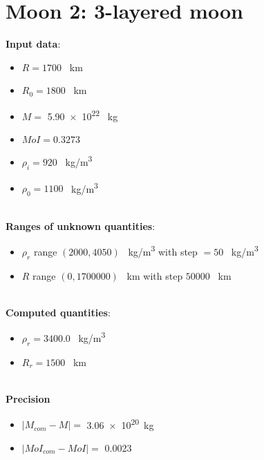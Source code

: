 \documentclass{article}
\begin{document}
\section*{Moon 2: 3-layered moon}
\textbf{Input data}:
\begin{itemize}
    \item $R = 1700$ \SI{}{km}
    \item $R_0 = 1800$ \SI{}{km}
    \item $M =$ \num{5.90e22} \SI{}{kg}
    \item $MoI = 0.3273$
    \item $\rho_i = 920$ \SI{}{kg/m^3}
    \item $\rho_0 = 1100$ \SI{}{kg/m^3}
\end{itemize}
\\
\textbf{Ranges of unknown quantities}:
\begin{itemize}
    \item $\rho_r$ range $(2000,4050)$ \SI{}{kg/m^3} with step $=50$ \SI{}{kg/m^3}
    \item $R$ range $(0,1700000)$ \SI{}{km} with step $50000$ \SI{}{km}
\end{itemize}
\\
\textbf{Computed quantities}:
    \begin{itemize}
        \item $\rho_r = 3400.0$ \SI{}{kg/m^3}
        \item $R_r = 1500$ \SI{}{km}
    \end{itemize}    
\\
\textbf{Precision}
\begin{itemize}
    \item $|M_{com}-M| =$ \num{3.06e+20}\SI{}{kg}
    \item $|MoI_{com}-MoI| =$ \num{0.0023}
\end{itemize}
\end{document}
